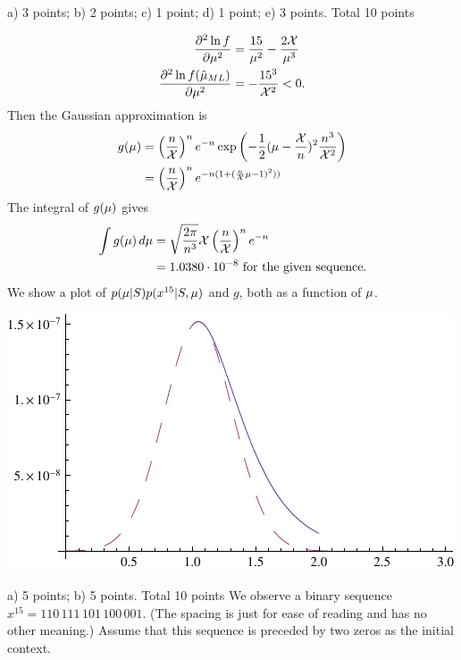 \documentclass[a4paper]{article}
\begin{document}
\begin{exam}
\begin{vraag}{a) 3 points; b) 2 points; c) 1 point; d) 1 point; e) 3 points. Total 10 points}
\begin{deelvraag}
{\begin{align*}
          \frac{\partial^2 \ln f}{\partial\mu^2} &=
          \frac{15}{\mu^2}-\frac{2\mathcal X}{\mu^3} \\
          \frac{\partial^2 \ln f(\hat{\mu}_{ML})}{\partial\mu^2} &=
          -\frac{15^3}{\mathcal X^2} < 0.
        \end{align*}
        Then the Gaussian approximation is
        \begin{align*}
          g(\mu) &= \left(\frac{n}{\mathcal X}\right)^n e^{-n}
          \exp\left(-\frac12(\mu-\frac{\mathcal X}{n})^2
            \frac{n^3}{\mathcal X^2}\right) \\
          &= \left(\frac{n}{\mathcal X}\right)^n
          e^{-n(1+(\frac{n}{\mathcal X}\mu-1)^2))}
        \end{align*}
        The integral of $g(\mu)$ gives
        \begin{align*}
          \int g(\mu)\,d\mu &= \sqrt{\frac{2\pi}{n^3}}\mathcal X
          \left(\frac{n}{\mathcal X}\right)^n e^{-n} \\
          &= 1.0380\cdot10^{-8}\text{ for the given sequence}.
        \end{align*}
        We show a plot of $p(\B|\M)p(x^{15}|\M,\B)$ and $g$, both
        as a function of $\mu$.
        \begin{center}
            \includegraphics{laplaceApprox.pdf}
        \end{center}
      }
\end{deelvraag}
\end{vraag}



\renewcommand{\M}{\ensuremath{S}}
\newcommand{\cS}{\ensuremath{\mathcal S}}
\newcommand{\pt}{\ensuremath{\theta}}

\begin{vraag}{a) 5 points; b) 5 points. Total 10 points}
  We observe a binary sequence $x^{15}=110\,111\,101\,100\,001$. (The
  spacing is just for ease of reading and has no other meaning.)
  Assume that this sequence is preceded by two zeros as the initial
  context.


\end{vraag}
\end{exam}
\end{document}
